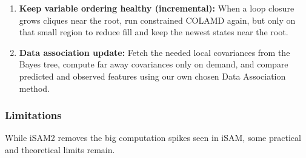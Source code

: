 \begin{enumerate}
    \item \textbf{Keep variable ordering healthy (incremental):} When a loop closure grows cliques near the root, run constrained \gls{COLAMD} again, but only on that small region to reduce fill and keep the newest states near the root.
    
    \item \textbf{Data association update:} Fetch the needed local covariances from the Bayes tree, compute far away covariances only on demand, and compare predicted and observed features using our own chosen Data Association method.
\end{enumerate}



\subsubsection{Limitations}
While \gls{iSAM}2 removes the big computation spikes seen in \gls{iSAM}, some practical and theoretical limits remain.

